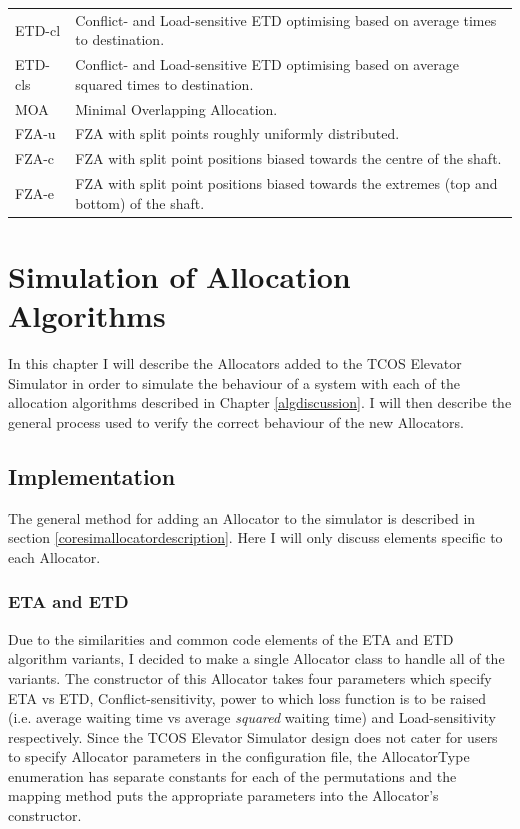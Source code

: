\documentclass{UoYCSproject}
\begin{document}
\begin{tabularx}{\linewidth}{l X}
	ETD-cl		& Conflict- and Load-sensitive ETD optimising based on average times to destination. \\
	ETD-cls		& Conflict- and Load-sensitive ETD optimising based on average squared times to destination. \\
	MOA			& Minimal Overlapping Allocation. \\
	FZA-u		& FZA with split points roughly uniformly distributed. \\
	FZA-c		& FZA with split point positions biased towards the centre of the shaft. \\
	FZA-e		& FZA with split point positions biased towards the extremes (top and bottom) of the shaft.
\end{tabularx}

\chapter{Simulation of Allocation Algorithms}
\label{algsimulation}

In this chapter I will describe the Allocators added to the TCOS Elevator Simulator in order to simulate the behaviour of a system with each of the allocation algorithms described in Chapter \ref{algdiscussion}.  I will then describe the general process used to verify the correct behaviour of the new Allocators.

\section{Implementation}

The general method for adding an Allocator to the simulator is described in section \ref{coresimallocatordescription}.  Here I will only discuss elements specific to each Allocator.

\subsection{ETA and ETD}

Due to the similarities and common code elements of the ETA and ETD algorithm variants, I decided to make a single Allocator class to handle all of the variants.  The constructor of this Allocator takes four parameters which specify ETA vs ETD, Conflict-sensitivity, power to which loss function is to be raised (i.e. average waiting time vs average \textit{squared} waiting time) and Load-sensitivity respectively.  Since the TCOS Elevator Simulator design does not cater for users to specify Allocator parameters in the configuration file, the AllocatorType enumeration has separate constants for each of the permutations and the mapping method puts the appropriate parameters into the Allocator's constructor.
\end{document}
